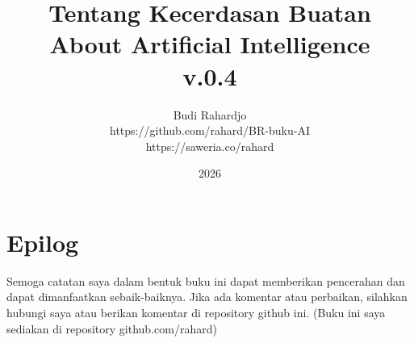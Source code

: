 \documentclass[11pt, oneside]{memoir} %
\title{Tentang Kecerdasan Buatan \\ \large About Artificial Intelligence\\v.0.4}
\author{Budi Rahardjo\\https://github.com/rahard/BR-buku-AI\\https://saweria.co/rahard}
\date{2026} %
\begin{document}

\maketitle
\thispagestyle{empty}

\frontmatter
\tableofcontents

\mainmatter







\backmatter
\chapter{Epilog}
Semoga catatan saya dalam bentuk buku ini dapat memberikan pencerahan
dan dapat dimanfaatkan sebaik-baiknya.
Jika ada komentar atau perbaikan, silahkan hubungi saya atau berikan
komentar di repository github ini. 
(Buku ini saya sediakan di repository github.com/rahard)

 

\printindex
\end{document}
